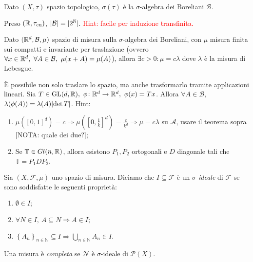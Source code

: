 \begin{definition}
	Dato $(X,\tau)$ spazio topologico, $\sigma(\tau)$ è la $\sigma$-algebra dei Boreliani $\mathcal{B}$.
\end{definition}
\begin{exercise}
	Preso $ (\mathbb{R},\tau_{\text{eu}}) $, $\left|\mathcal{B}\right| = |2^{\mathbb{N}}| $.
	\textcolor{red}{Hint: facile per induzione transfinita.}
\end{exercise} 
\begin{exercise}
	Dato $(\mathbb{R}^d, \mathcal{B}, \mu)$ spazio di misura sulla $\sigma$-algebra dei Boreliani, con $\mu$ misura finita sui compatti e invariante per traslazione (ovvero $\forall x \in \R^d,\ \forall A \in \mathcal{B},\ \mu(x+A)=\mu(A)$), allora $\exists c > 0 : \mu=c\lambda$ dove $\lambda$ è la misura di Lebesgue.
\end{exercise}
\begin{exercise}
	È possibile non solo traslare lo spazio, ma anche trasformarlo tramite applicazioni lineari. Sia $T\in\mathrm{GL}(d,\R),\ \phi\colon\R^d \to \R^d,\ \phi(x)=Tx$. Allora $\forall A \in \mathcal{B}$, $ {\lambda(\phi(A))=\lambda(A)\abs{\det T} }$.
	Hint:
	\begin{enumerate}
		\item $\mu([0,1]^d)=c\Rightarrow \mu([0, \frac{1}{k}]^d)=\frac{c}{k^d}\Rightarrow \mu=c\lambda$ su $\mathcal{A}$, usare il teorema sopra {\color{red}[NOTA: quale dei due?]};
		\item Se $\mathbb{T} \in Gl(n,\mathbb{R})$, allora esistono $P_1, P_2$ ortogonali e $D$ diagonale tali che $\mathbb{T}=P_1DP_2$.
	\end{enumerate}
\end{exercise}

\begin{definition}
	Sia $ (X,\mathcal{F},\mu) $ uno spazio di misura. Diciamo che $ I\subseteq\mathcal{F} $ è un \emph{$ \sigma $-ideale} di $ \mathcal{F} $ se sono soddisfatte le seguenti proprietà:
	\begin{enumerate}[label=(\roman*)]
		\item $ \emptyset\in I $;
		\item $ \forall N\in I,\ A\subseteq N \Rightarrow A \in I $;
		\item $ \left\{A_n \right\}_{n\in\mathbb{N}} \subseteq I \Rightarrow \bigcup\limits_{n\in\mathbb{N}} A_n\in I $.
	\end{enumerate}
\end{definition}

\begin{definition}
	Una misura è \emph{completa} se $ \mathscr{N} $ è $ \sigma $-ideale di $ \mathscr{P}(X) $.
\end{definition}

